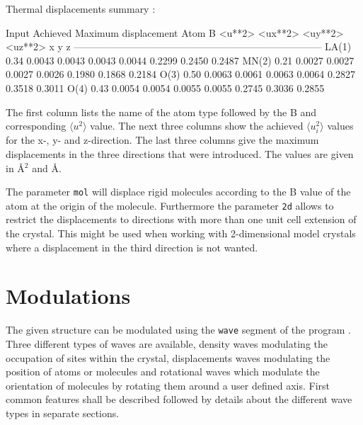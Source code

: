 \begin{MacVerbatim}
   Thermal displacements summary :

                 Input               Achieved             Maximum displacement
   Atom        B   <u**2>     <ux**2> <uy**2> <uz**2>        x      y      z
   ---------------------------------------------------------------------------
   LA(1)     0.34  0.0043      0.0043  0.0043  0.0044     0.2299 0.2450 0.2487
   MN(2)     0.21  0.0027      0.0027  0.0027  0.0026     0.1980 0.1868 0.2184
   O(3)      0.50  0.0063      0.0061  0.0063  0.0064     0.2827 0.3518 0.3011
   O(4)      0.43  0.0054      0.0054  0.0055  0.0055     0.2745 0.3036 0.2855
\end{MacVerbatim}
%
The first column lists the name of the atom type followed by the B
and corresponding $\langle u^{2} \rangle$ value. The next three
columns show the achieved $\langle u_{i}^{2} \rangle$ values for
the x-, y- and z-direction. The last three columns give the
maximum displacements in the three directions that were
introduced. The values are given in \AA$^{2}$ and \AA. \par

The parameter {\tt mol} will displace rigid molecules according to
the B value of the atom at the origin of the molecule. Furthermore
the parameter {\tt 2d} allows to restrict the displacements to
directions with more than one unit cell extension of the crystal.
This might be used when working with 2-dimensional model crystals
where a displacement in the third direction is not wanted.


\section{Modulations \label{mod-wave}}

The given structure can be modulated using the {\tt wave} segment of
the program \Discus. Three different types of waves are
available, density waves modulating the occupation of sites within
the crystal, displacements waves modulating the position of atoms or
molecules and rotational waves which modulate the orientation of
molecules by rotating them around a user defined axis. First common
features shall be described followed by details about the different
wave types in separate sections. \par

